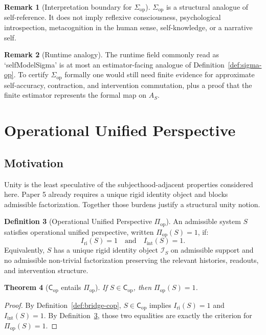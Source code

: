 \documentclass[11pt,a4paper]{article}
\newtheorem{theorem}{Theorem}[section]
\theoremstyle{definition}
\newtheorem{definition}[theorem]{Definition}
\newtheorem{remark}[theorem]{Remark}
\newcommand{\Cop}{\mathsf{C}_{\mathrm{op}}}
\newcommand{\Sigmaop}{\Sigma_{\mathrm{op}}}
\newcommand{\Piop}{\Pi_{\mathrm{op}}}
\newcommand{\Aset}{A_S}
\newcommand{\IdS}{\mathcal{I}_S}
\newcommand{\Iri}{I_{\mathrm{ri}}}
\newcommand{\Iint}{I_{\mathrm{int}}}
\begin{document}
\begin{remark}[Interpretation boundary for $\Sigmaop$]
$\Sigmaop$ is a structural analogue of self-reference. It does not imply reflexive consciousness, psychological introspection, metacognition in the human sense, self-knowledge, or a narrative self.
\end{remark}

\begin{remark}[Runtime analogy]
The runtime field commonly read as `selfModelSigma' is at most an estimator-facing analogue of Definition~\ref{def:sigma-op}. To certify $\Sigmaop$ formally one would still need finite evidence for approximate self-accuracy, contraction, and intervention commutation, plus a proof that the finite estimator represents the formal map on $\Aset$.
\end{remark}

\section{Operational Unified Perspective}

\subsection{Motivation}
Unity is the least speculative of the subjecthood-adjacent properties considered here. Paper 5 already requires a unique rigid identity object and blocks admissible factorization. Together those burdens justify a structural unity notion.

\begin{definition}[Operational Unified Perspective $\Piop$]\label{def:pi-op}
An admissible system $S$ satisfies operational unified perspective, written $\Piop(S)=1$, if:
\[
\Iri(S)=1
\quad\text{and}\quad
\Iint(S)=1.
\]
Equivalently, $S$ has a unique rigid identity object $\IdS$ on admissible support and no admissible non-trivial factorization preserving the relevant histories, readouts, and intervention structure.
\end{definition}

\begin{theorem}[$\Cop$ entails $\Piop$]\label{thm:cop-entails-pi}
If $S\in\Cop$, then $\Piop(S)=1$.
\end{theorem}

\begin{proof}
By Definition~\ref{def:bridge-cop}, $S\in\Cop$ implies $\Iri(S)=1$ and $\Iint(S)=1$. By Definition~\ref{def:pi-op}, those two equalities are exactly the criterion for $\Piop(S)=1$.
\end{proof}
\end{document}
